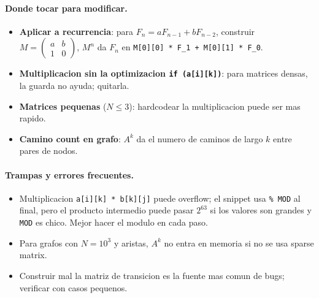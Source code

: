 \paragraph{Donde tocar para modificar.}
\begin{itemize}\setlength\itemsep{0pt}
	\item \textbf{Aplicar a recurrencia}: para $F_n = a F_{n-1} + b F_{n-2}$, construir $M = \begin{pmatrix} a & b \\ 1 & 0 \end{pmatrix}$, $M^n$ da $F_n$ en \texttt{M[0][0] * F\_1 + M[0][1] * F\_0}.
	\item \textbf{Multiplicacion sin la optimizacion \texttt{if (a[i][k])}}: para matrices densas, la guarda no ayuda; quitarla.
	\item \textbf{Matrices pequenas} ($N \le 3$): hardcodear la multiplicacion puede ser mas rapido.
	\item \textbf{Camino count en grafo}: $A^k$ da el numero de caminos de largo $k$ entre pares de nodos.
\end{itemize}

\paragraph{Trampas y errores frecuentes.}
\begin{itemize}\setlength\itemsep{0pt}
	\item Multiplicacion \texttt{a[i][k] * b[k][j]} puede overflow; el snippet usa \texttt{\% MOD} al final, pero el producto intermedio puede pasar $2^{63}$ si los valores son grandes y \texttt{MOD} es chico. Mejor hacer el modulo en cada paso.
	\item Para grafos con $N = 10^3$ y aristas, $A^k$ no entra en memoria si no se usa sparse matrix.
	\item Construir mal la matriz de transicion es la fuente mas comun de bugs; verificar con casos pequenos.
\end{itemize}


